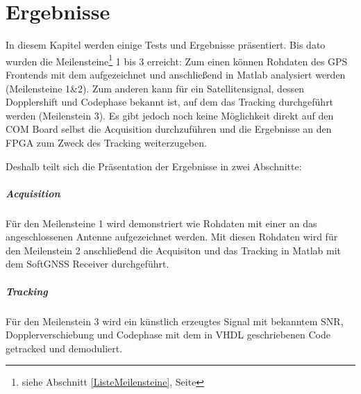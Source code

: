 \chapter{Ergebnisse}

In diesem Kapitel werden einige Tests und Ergebnisse präsentiert. Bis dato wurden die Meilensteine\footnote{siehe Abschnitt \ref{ListeMeilensteine}, Seite \pageref{ListeMeilensteine}} 1 bis 3 erreicht: Zum einen können Rohdaten des GPS Frontends mit dem \comboard aufgezeichnet und anschließend in Matlab analysiert werden (Meilensteine 1\&2). Zum anderen kann für ein Satellitensignal, dessen Dopplershift und Codephase bekannt ist, auf dem \comboard das Tracking durchgeführt werden (Meilenstein 3). Es gibt jedoch noch keine Möglichkeit direkt auf den COM Board selbst die Acquisition durchzuführen und die Ergebnisse an den FPGA zum Zweck des Tracking weiterzugeben.

Deshalb teilt sich die Präsentation der Ergebnisse in zwei Abschnitte: 

\paragraph{Acquisition} Für den Meilensteine 1 wird demonstriert wie Rohdaten mit einer an das  \comboard angeschlossenen Antenne aufgezeichnet werden. Mit diesen Rohdaten wird für den Meilenstein 2 anschließend die Acquisiton und das Tracking in Matlab mit dem SoftGNSS Receiver durchgeführt.

\paragraph{Tracking} Für den Meilenstein 3 wird ein künstlich erzeugtes Signal mit bekanntem SNR, Dopplerverschiebung und Codephase mit dem in VHDL geschriebenen Code getracked und demoduliert.





